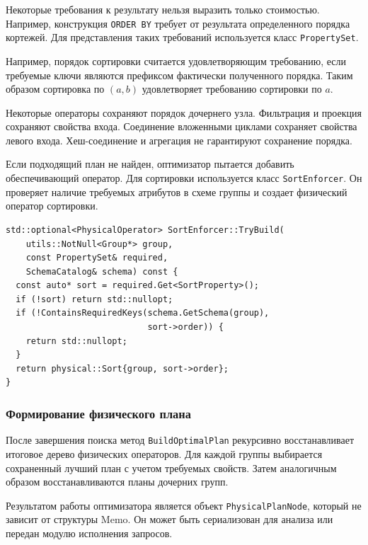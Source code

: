\documentclass[14pt, russian]{scrartcl}
\begin{document}
Некоторые требования к результату нельзя выразить только стоимостью. Например,
конструкция \verb|ORDER BY| требует от результата определенного порядка
кортежей. Для представления таких требований используется класс
\verb|PropertySet|.

Например, порядок сортировки считается удовлетворяющим требованию, если
требуемые ключи являются префиксом фактически полученного порядка. Таким образом
сортировка по $(a, b)$ удовлетворяет требованию сортировки по $a$.

Некоторые операторы сохраняют порядок дочернего узла. Фильтрация и проекция
сохраняют свойства входа. Соединение вложенными циклами сохраняет свойства
левого входа. Хеш-соединение и агрегация не гарантируют сохранение порядка.

Если подходящий план не найден, оптимизатор пытается добавить обеспечивающий
оператор. Для сортировки используется класс \verb|SortEnforcer|. Он проверяет
наличие требуемых атрибутов в схеме группы и создает физический оператор
сортировки.

\begin{listing}[H]
  \caption{Добавление оператора сортировки для обеспечения свойства.}
  \label{lst:sort-enforcer}
  \begin{verbatim}
std::optional<PhysicalOperator> SortEnforcer::TryBuild(
    utils::NotNull<Group*> group,
    const PropertySet& required,
    SchemaCatalog& schema) const {
  const auto* sort = required.Get<SortProperty>();
  if (!sort) return std::nullopt;
  if (!ContainsRequiredKeys(schema.GetSchema(group),
                            sort->order)) {
    return std::nullopt;
  }
  return physical::Sort{group, sort->order};
}
  \end{verbatim}
\end{listing}

\subsubsection{Формирование физического плана}

После завершения поиска метод \verb|BuildOptimalPlan| рекурсивно восстанавливает
итоговое дерево физических операторов. Для каждой группы выбирается сохраненный
лучший план с учетом требуемых свойств. Затем аналогичным образом
восстанавливаются планы дочерних групп.

Результатом работы оптимизатора является объект \verb|PhysicalPlanNode|, который
не зависит от структуры Memo. Он может быть сериализован для анализа или передан
модулю исполнения запросов.
\end{document}
